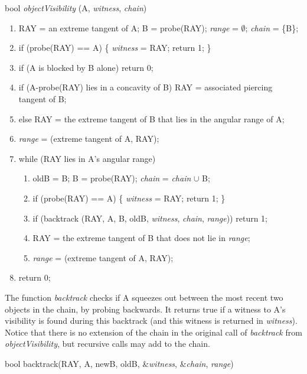 \documentclass[12pt]{article}
\begin{document}
\vspace{.2in}

bool {\em objectVisibility} (A, {\em witness}, {\em chain})

\begin{enumerate}
\item RAY = an extreme tangent of A; B = probe(RAY); {\em range} = $\emptyset$; 
      {\em chain} = \{B\};
\item if (probe(RAY) == A) \{ {\em witness} = RAY; return 1; \}
\item if (A is blocked by B alone) return 0;
\item if (A-probe(RAY) lies in a concavity of B) RAY = associated piercing tangent of B;
\item else RAY = the extreme tangent of B that lies in the angular range of A;
\item {\em range}    = (extreme tangent of A, RAY);

\item while (RAY lies in A's angular range)
  \begin{enumerate}
  \item oldB = B;  B = probe(RAY); {\em chain} = {\em chain} $\cup$ B;
  \item if (probe(RAY) == A) \{ {\em witness} = RAY; return 1; \}
  \item if (backtrack (RAY, A, B, oldB, {\em witness}, {\em chain}, {\em range})) return 1;
  \item RAY = the extreme tangent of B that does not lie in {\em range};
  \item {\em range} = (extreme tangent of A, RAY);
  \end{enumerate}
\item return 0;
\end{enumerate}

The function {\em backtrack} checks if A 
squeezes out between the most recent two objects in the chain,
by probing backwards.
It returns true if a witness to A's visibility is found
during this backtrack (and this witness is returned in {\em witness}).
Notice that there is no extension of the chain in the original call of {\em backtrack}
from {\em objectVisibility}, but recursive calls may add to the chain.

\vspace{.2in}

bool backtrack(RAY, A, newB, oldB, \&{\em witness}, \&{\em chain}, {\em range})
\end{document}
